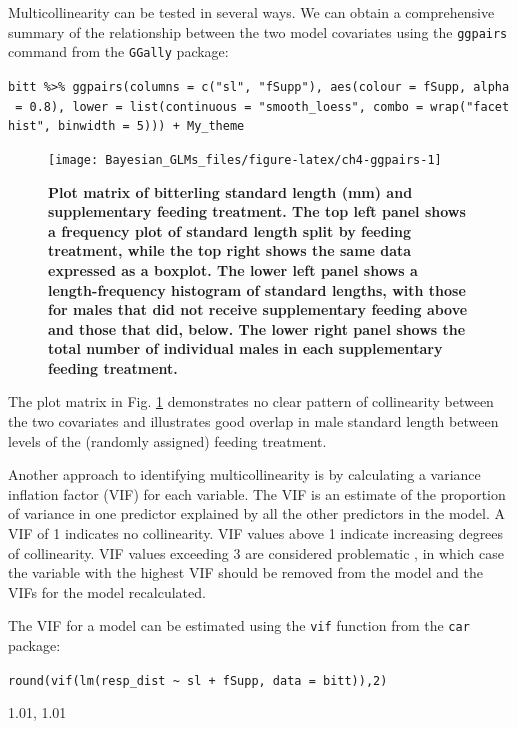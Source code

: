 \documentclass[
]{book}
\begin{document}
Multicollinearity can be tested in several ways. We can obtain a comprehensive summary of the relationship between the two model covariates using the \texttt{ggpairs} command from the \texttt{GGally} package:

\texttt{bitt\ \%\textgreater{}\%\ ggpairs(columns\ =\ c("sl",\ "fSupp"),\ aes(colour\ =\ fSupp,\ alpha\ =\ 0.8),\ lower\ =\ list(continuous\ =\ "smooth\_loess",\ combo\ =\ wrap("facethist",\ binwidth\ =\ 5)))\ +\ My\_theme}



\begin{figure}

{\centering \texttt{[image: Bayesian\_GLMs\_files/figure-latex/ch4-ggpairs-1]} 

}

\caption{\textbf{Plot matrix of bitterling standard length (mm) and supplementary feeding treatment. The top left panel shows a frequency plot of standard length split by feeding treatment, while the top right shows the same data expressed as a boxplot. The lower left panel shows a length-frequency histogram of standard lengths, with those for males that did not receive supplementary feeding above and those that did, below. The lower right panel shows the total number of individual males in each supplementary feeding treatment.}}\label{fig:ch4-ggpairs}
\end{figure}

The plot matrix in Fig. \ref{fig:ch4-ggpairs} demonstrates no clear pattern of collinearity between the two covariates and illustrates good overlap in male standard length between levels of the (randomly assigned) feeding treatment.

Another approach to identifying multicollinearity is by calculating a variance inflation factor (VIF) for each variable. The VIF is an estimate of the proportion of variance in one predictor explained by all the other predictors in the model. A VIF of 1 indicates no collinearity. VIF values above 1 indicate increasing degrees of collinearity. VIF values exceeding 3 are considered problematic \citep{Zuur_2009}, in which case the variable with the highest VIF should be removed from the model and the VIFs for the model recalculated.

The VIF for a model can be estimated using the \texttt{vif} function from the \texttt{car} package:

\texttt{round(vif(lm(resp\_dist\ \textasciitilde{}\ sl\ +\ fSupp,\ data\ =\ bitt)),2)}

1.01, 1.01
\end{document}
